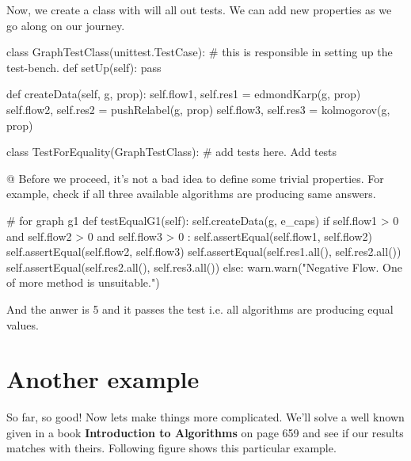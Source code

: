 \documentclass[10pt,a4paper]{article}%
\begin{document}
\nwendcode{}Now, we create a class with will all out tests. We can add new
    properties as we go along on our journey.

\nwenddocs{}\endmoddef\nwstartdeflinemarkup\nwenddeflinemarkup
class GraphTestClass(unittest.TestCase):  
    # this is responsible in setting up the test-bench.
    def setUp(self): pass

    def createData(self, g, prop):
        self.flow1, self.res1 = edmondKarp(g, prop)
        self.flow2, self.res2 = pushRelabel(g, prop)
        self.flow3, self.res3 = kolmogorov(g, prop)
 
class TestForEquality(GraphTestClass):
    # add tests here.
    \LA{}Add tests\RA{}

\eatline
\nwendcode{}\nwdocspar
    @ Before we proceed, it's not a bad idea to define some trivial properties.
    For example, check if all three available algorithms are producing same
    answers.

\nwenddocs{}\endmoddef\nwstartdeflinemarkup\nwenddeflinemarkup
# for graph g1
def testEqualG1(self):
    self.createData(g, e_caps)
    if self.flow1 > 0 and self.flow2 > 0 and self.flow3 > 0 : 
        self.assertEqual(self.flow1, self.flow2)
        self.assertEqual(self.flow2, self.flow3)
        self.assertEqual(self.res1.all(), self.res2.all())
        self.assertEqual(self.res2.all(), self.res3.all())
    else:
        warn.warn("Negative Flow. One of more method is unsuitable.")

\nwendcode{}And the anwer is 5 and it passes the test i.e. all algorithms are producing
equal values.

\nwenddocs{}\section{Another example}

    So far, so good! Now lets make things more complicated. We'll solve a well
    known given in a book \textbf{Introduction to Algorithms} on page 659 and
    see if our results matches with theirs. Following figure shows this
    particular example.
\end{document}
